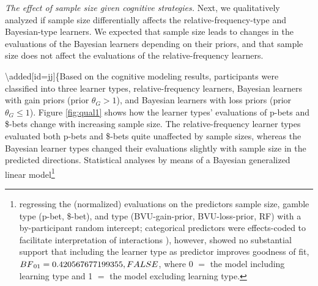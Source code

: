 \documentclass[a4paper, man, floatsintext]{apa6}
\let\rmarkdownfootnote\footnote%
\def\footnote{\protect\rmarkdownfootnote}
\begin{document}
\emph{The effect of sample size given cognitive strategies.} Next, we
qualitatively analyzed if sample size differentially affects the
relative-frequency-type and Bayesian-type learners. We expected that
sample size leads to changes in the evaluations of the Bayesian learners
depending on their priors, and that sample size does not affect the
evaluations of the relative-frequency learners.


\textbackslash{}added{[}id=jj{]}\{Based on the cognitive modeling
results, participants were classified into three learner types,
relative-frequency learners, Bayesian learners with gain priors (prior
\(\theta_G > 1\)), and Bayesian learners with loss priors (prior
\(\theta_G \leq 1\)). Figure \ref{fig:qual1} shows how the learner
types' evaluations of p-bets and \$-bets change with increasing sample
size. The relative-frequency learner types evaluated both p-bets and
\$-bets quite unaffected by sample sizes, whereas the Bayesian learner
types changed their evaluations slightly with sample size in the
predicted directions. Statistical analyses by means of a Bayesian
generalized linear
model\footnote{regressing the (normalized) evaluations on the predictors sample size, gamble type (p-bet, \$-bet), and type (BVU-gain-prior, BVU-loss-prior, RF) with a by-participant random intercept; categorical predictors were effects-coded to facilitate interpretation of interactions \citep[for details, see][]{SingmannForthcoming}), however, showed no substantial support that including the learner type as predictor improves goodness of fit, $BF\textsubscript{01}=0.420567677199355, FALSE$, where 0 $=$ the model including learning type and 1 $=$ the model excluding learning type.}
\end{document}
